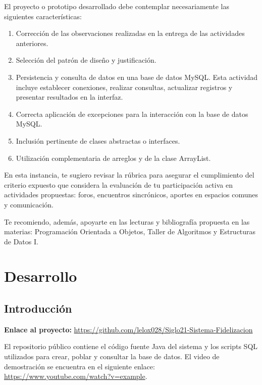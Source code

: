 \documentclass{article}
\begin{document}
El proyecto o prototipo desarrollado debe contemplar necesariamente las siguientes características:

\begin{enumerate}
    \item Corrección de las observaciones realizadas en la entrega de las actividades anteriores.
    \item Selección del patrón de diseño y justificación.
    \item Persistencia y consulta de datos en una base de datos MySQL. Esta actividad incluye establecer conexiones, realizar consultas, actualizar registros y presentar resultados en la interfaz.
    \item Correcta aplicación de excepciones para la interacción con la base de datos MySQL.
    \item Inclusión pertinente de clases abstractas o interfaces.
    \item Utilización complementaria de arreglos y de la clase ArrayList. 
\end{enumerate}


En esta instancia, te sugiero revisar la rúbrica para asegurar el cumplimiento del criterio expuesto que considera la evaluación de tu participación activa en actividades propuestas: foros, encuentros sincrónicos, aportes en espacios comunes y comunicación.

\vspace{3pt}

Te recomiendo, además, apoyarte en las lecturas y bibliografía propuesta en las materias: Programación Orientada a Objetos, Taller de Algoritmos y Estructuras de Datos I.

\newpage


\section{Desarrollo}
\subsection{Introducción} 
\textbf{Enlace al proyecto:} \url{https://github.com/lelox028/Siglo21-Sistema-Fidelizacion}

El repositorio público contiene el código fuente Java del sistema y los scripts SQL utilizados para crear, poblar y consultar la base de datos. El video de demostración se encuentra en el siguiente enlace: \url{https://www.youtube.com/watch?v=example}.
\end{document}
